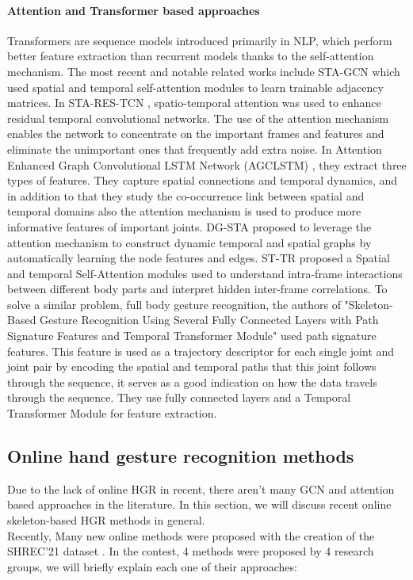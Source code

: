 \paragraph{Attention and Transformer based approaches}
Transformers are sequence models introduced primarily in NLP, which perform better feature extraction than recurrent models thanks to the self-attention mechanism. The most recent and notable related works include STA-GCN \cite{sta-gcn} which used spatial and temporal self-attention modules to learn trainable adjacency matrices. In STA-RES-TCN \cite{res-tcn}, spatio-temporal attention was used to enhance residual temporal convolutional networks. The use of the attention mechanism enables the network to concentrate on the important frames and features and eliminate the unimportant ones that frequently add extra noise. In Attention Enhanced Graph Convolutional LSTM Network (AGCLSTM) \cite{si2019attention}, they extract three types of features. They capture spatial connections and temporal dynamics, and in addition to that they study the co-occurrence link between spatial and temporal domains also the attention mechanism is used to produce more informative features of important joints. DG-STA \cite{dg-sta} proposed to leverage the attention mechanism to construct dynamic temporal and spatial graphs by automatically learning the node features and edges. ST-TR \cite{st-tr} proposed a Spatial and temporal Self-Attention modules used to understand intra-frame interactions between different body parts and interpret hidden inter-frame correlations. To solve a similar problem, full body gesture recognition, the authors of "Skeleton-Based Gesture Recognition Using Several Fully Connected Layers with Path Signature Features and Temporal Transformer Module"  \cite{li2019skeleton} used path signature features. This feature is used as a trajectory descriptor for each single joint and joint pair by encoding the spatial and temporal paths that this joint follows through the sequence, it serves as a good indication on how the data travels through the sequence. They use fully connected layers and a Temporal Transformer Module for feature extraction. \\



\subsection{Online hand gesture recognition methods}
Due to the lack of online HGR in recent, there aren't many GCN and attention based approaches in the literature. In this section, we will discuss recent online skeleton-based HGR methods in general. \\
Recently, Many new online methods were proposed with the creation of the SHREC'21 dataset \cite{shrec21}. In the contest, 4 methods were proposed by 4 research groups, we will briefly explain each one of their approaches: \\

